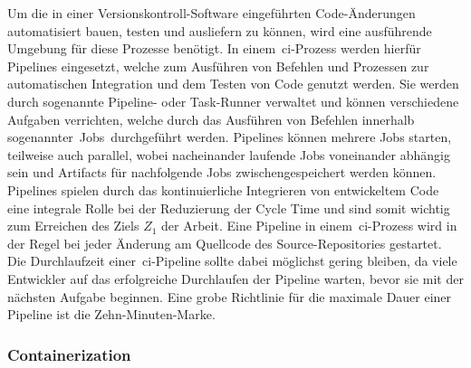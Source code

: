 Um die in einer Versionskontroll-Software eingeführten Code-Änderungen automatisiert bauen, testen und ausliefern zu
können, wird eine ausführende Umgebung für diese Prozesse benötigt.
In einem\ \acrshort{ci}-Prozess werden hierfür Pipelines eingesetzt, welche zum Ausführen von Befehlen und Prozessen
zur automatischen Integration und dem Testen von Code genutzt werden.
Sie werden durch sogenannte Pipeline- oder Task-Runner verwaltet und können verschiedene Aufgaben verrichten,
welche durch das Ausführen von Befehlen innerhalb sogenannter\ \glqq Jobs\grqq\ durchgeführt werden.
Pipelines können mehrere Jobs starten, teilweise auch parallel, wobei nacheinander laufende Jobs voneinander
abhängig sein und Artifacts für nachfolgende Jobs zwischengespeichert werden können.
Pipelines spielen durch das kontinuierliche Integrieren von entwickeltem Code eine integrale Rolle bei der Reduzierung
der Cycle Time und sind somit wichtig zum Erreichen des Ziels $Z_1$ der Arbeit.
Eine Pipeline in einem\ \acrshort{ci}-Prozess wird in der Regel bei jeder Änderung am Quellcode des Source-Repositories
gestartet.
Die Durchlaufzeit einer\ \acrshort{ci}-Pipeline sollte dabei möglichst gering bleiben, da viele Entwickler
auf das erfolgreiche Durchlaufen der Pipeline warten, bevor sie mit der nächsten Aufgabe beginnen.
Eine grobe Richtlinie für die maximale Dauer einer Pipeline ist die Zehn-Minuten-Marke.

\subsubsection{Containerization}

